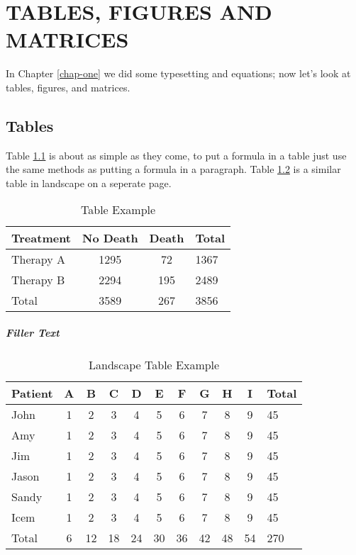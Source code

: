 \chapter{TABLES, FIGURES AND MATRICES}
\label{chap-two}
In Chapter \ref{chap-one} we did some typesetting and equations; now let's 
look at tables, figures, and matrices.

\section{Tables}
Table \ref{tab:one} is about as simple as they come, to put a formula in a 
table just use the same methods as putting a formula in a paragraph.  
Table \ref{tab:two} is a similar table in landscape on a seperate page.  
%
\begin{table}
\caption{Table Example}
\label{tab:one}
\begin{center}
\begin{tabular}{lccl}
\toprule
Treatment & No Death & Death & Total\\
\midrule
Therapy A & 1295 & 72 & 1367\\
Therapy B 	& 2294 & 195 & 2489\\
\midrule
Total & 3589 & 267 & 3856\\
\bottomrule
\end{tabular}
\end{center}
\end{table}

\paragraph{Filler Text} \lipsum[1-2]

\thispagestyle{lscapedplain}
\begin{landscape}
\begin{table}
\caption{Landscape Table Example}
\label{tab:two}
\begin{center}
\begin{tabular}{lcccccccccl}
\toprule
Patient & A & B & C & D & E & F & G & H &I & Total \\
\midrule
John & 1 & 2 & 3 & 4 & 5 & 6 & 7 & 8 & 9 & 45 \\
Amy & 1 & 2 & 3 & 4 & 5 & 6 & 7 & 8 & 9 & 45 \\
Jim & 1 & 2 & 3 & 4 & 5 & 6 & 7 & 8 & 9 & 45 \\
Jason & 1 & 2 & 3 & 4 & 5 & 6 & 7 & 8 & 9 & 45 \\
Sandy & 1 & 2 & 3 & 4 & 5 & 6 & 7 & 8 & 9 & 45 \\
Icem & 1 & 2 & 3 & 4 & 5 & 6 & 7 & 8 & 9 & 45 \\
\midrule
Total & 6 & 12 & 18 & 24 & 30 & 36 & 42 & 48 & 54 & 270\\
\bottomrule
\end{tabular}
\end{center}
\end{table}
\end{landscape}
\restoregeometry
\pagestyle{plain}
\thispagestyle{plain}


